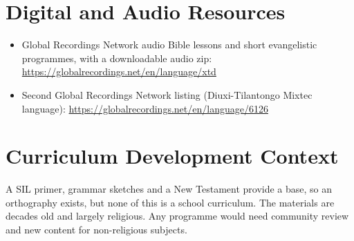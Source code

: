 \documentclass[12pt]{article}
\begin{document}
\section{Digital and Audio Resources}
\begin{itemize}
\item Global Recordings Network audio Bible lessons and short evangelistic programmes, with a downloadable audio zip: \url{https://globalrecordings.net/en/language/xtd}
\item Second Global Recordings Network listing (Diuxi-Tilantongo Mixtec language): \url{https://globalrecordings.net/en/language/6126}
\end{itemize}

\section{Curriculum Development Context}
A SIL primer, grammar sketches and a New Testament provide a base, so an orthography exists, but none of this is a school curriculum. The materials are decades old and largely religious. Any programme would need community review and new content for non-religious subjects.
\end{document}
